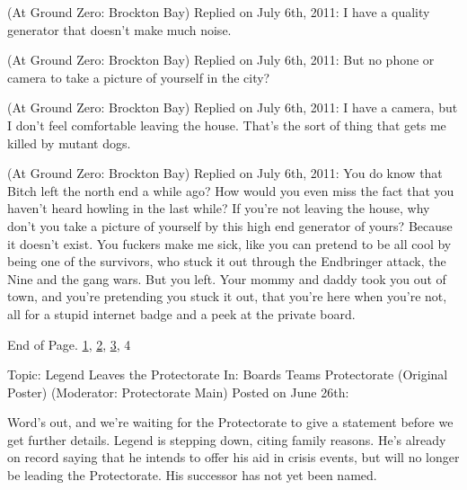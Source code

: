 \blacktriangleright {}(At Ground Zero: Brockton Bay)
Replied on July 6th, 2011:
I have a quality generator that doesn't make much noise.



\blacktriangleright {}(At Ground Zero: Brockton Bay)
Replied on July 6th, 2011:
But no phone or camera to take a picture of yourself in the city?



\blacktriangleright {}(At Ground Zero: Brockton Bay)
Replied on July 6th, 2011:
I have a camera, but I don't feel comfortable leaving the house.  That's the sort of thing that gets me killed by mutant dogs.



\blacktriangleright {} (At Ground Zero: Brockton Bay)
Replied on July 6th, 2011:
You do know that Bitch left the north end a while ago?  How would you even miss the fact that you haven't heard howling in the last while?  If you're not leaving the house, why don't you take a picture of yourself by this high end generator of yours?  Because it doesn't exist.
You fuckers make me sick, like you can pretend to be all cool by being one of the survivors, who stuck it out through the Endbringer attack, the Nine and the gang wars.  But you left.  Your mommy and daddy took you out of town, and you're pretending you stuck it out, that you're here when you're not, all for a stupid internet badge and a peek at the private board.



End of Page.   \underline{1}, \underline{2}, \underline{3}, 4



\blacksquare



\blacklozenge  Topic:  Legend Leaves the Protectorate
In:  Boards \blacktriangleright Teams \blacktriangleright Protectorate (Original Poster) (Moderator: Protectorate Main)
Posted on June 26th:



Word's out, and we're waiting for the Protectorate to give a statement before we get further details.  Legend is stepping down, citing family reasons.  He's already on record saying that he intends to offer his aid in crisis events, but will no longer be leading the Protectorate.  His successor has not yet been named.






